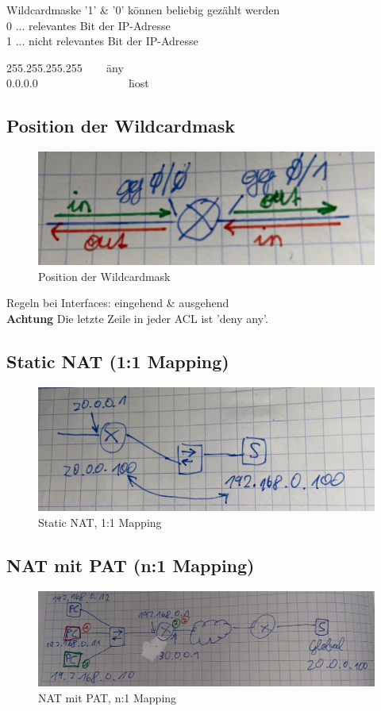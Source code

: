 Wildcardmaske '1' \& '0' können beliebig gezählt werden \\
0 ... relevantes Bit der IP-Adresse \\
1 ... nicht relevantes Bit der IP-Adresse

\begin{tabbing}
	255.255.255.255 ~~~ \= any \\
	0.0.0.0 ~~~~~~~~~~~~~~~ \= host
\end{tabbing}

\subsection*{Position der Wildcardmask}
\begin{figure}[H]
	\centering
	\includegraphics[width=0.8\linewidth]{figures/wildcard.jpeg}
	\caption{Position der Wildcardmask}
\end{figure}

Regeln bei Interfaces: eingehend \& ausgehend \\
\textbf{Achtung} Die letzte Zeile in jeder ACL ist 'deny any'.

\subsection*{Static NAT (1:1 Mapping)}
\begin{figure}[H]
	\centering
	\includegraphics[width=0.8\linewidth]{figures/static_nat.jpeg}
	\caption{Static NAT, 1:1 Mapping}
\end{figure}

\subsection*{NAT mit PAT (n:1 Mapping)}
\begin{figure}[H]
	\centering
	\includegraphics[width=0.8\linewidth]{figures/pat_nat.jpeg}
	\caption{NAT mit PAT, n:1 Mapping}
\end{figure}

